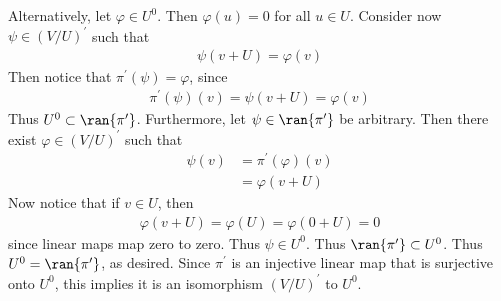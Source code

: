 \documentclass{book}
\begin{document}
\begin{enumerate}[label=\arabic*)]
\begin{enumerate}[label=\alph*)]
        Alternatively, let $\varphi \in U^0$. Then $\varphi(u) = 0$ for all $u \in U$. Consider now $\psi \in (V/U)^{\prime}$ such that 
          \begin{align*}
            \psi(v + U) = \varphi(v)
          \end{align*}
          Then notice that $\pi^{\prime}(\psi) = \varphi$, since
          \begin{align*}
            \pi^{\prime}(\psi)(v) = \psi(v + U) = \varphi(v)
          \end{align*}
          Thus $U^0 \subset \ran{\pi^{\prime}}$. Furthermore, let $\psi \in \ran{\pi^{\prime}}$ be arbitrary. Then there exist $\varphi \in (V/U)^{\prime}$ such that
          \begin{align*}
            \psi(v) & = \pi^{\prime}(\varphi)(v) \\
            & = \varphi(v + U)
          \end{align*}
          Now notice that if $v \in U$, then 
          \begin{align*}
            \varphi(v + U) = \varphi(U) = \varphi(0 + U) = 0 
          \end{align*}
          since linear maps map zero to zero. Thus $\psi \in U^0$. Thus $\ran{\pi^{\prime}} \subset U^0$. Thus $U^0 = \ran{\pi^{\prime}}$, as desired.
        \ii
          Since $\pi^{\prime}$ is an injective linear map that is surjective onto $U^0$, this implies it is an isomorphism $(V/U)^{\prime}$ to $U^0$.
      \end{enumerate}
  \end{enumerate}
\end{document}

